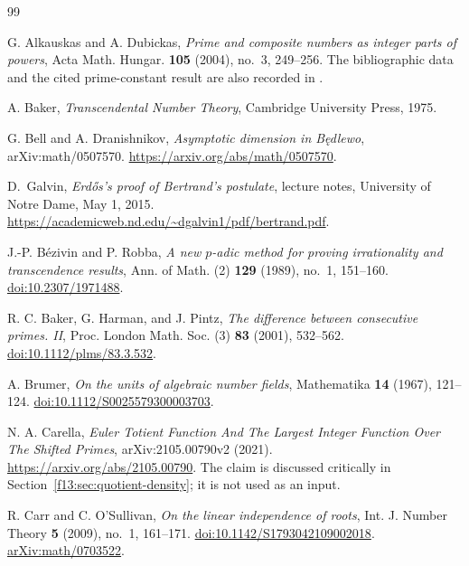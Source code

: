 \documentclass[11pt,a4paper]{article}
\theoremstyle{definition}
\theoremstyle{remark}
\numberwithin{equation}{section}
\begin{document}
\clearpage
{}
\begingroup\footnotesize
\begin{thebibliography}{99}

G. Alkauskas and A. Dubickas,
\emph{Prime and composite numbers as integer parts of powers},
Acta Math. Hungar. \textbf{105} (2004), no.~3, 249--256.
The bibliographic data and the cited prime-constant result are also
recorded in \cite{SaitoMills,SaitoTakeda2022}.

A. Baker, \emph{Transcendental Number Theory}, Cambridge University Press, 1975.

G. Bell and A. Dranishnikov, \emph{Asymptotic dimension in B\k{e}dlewo},
arXiv:math/0507570.
\url{https://arxiv.org/abs/math/0507570}.

D.~Galvin,
\emph{Erd\H{o}s's proof of Bertrand's postulate},
lecture notes, University of Notre Dame, May 1, 2015.
\url{https://academicweb.nd.edu/~dgalvin1/pdf/bertrand.pdf}.

J.-P. B\'ezivin and P. Robba,
\emph{A new $p$-adic method for proving irrationality and transcendence results},
Ann. of Math. (2) \textbf{129} (1989), no.~1, 151--160.
\href{https://doi.org/10.2307/1971488}{doi:10.2307/1971488}.

R. C. Baker, G. Harman, and J. Pintz,
\emph{The difference between consecutive primes. II},
Proc. London Math. Soc. (3) \textbf{83} (2001), 532--562.
\href{https://doi.org/10.1112/plms/83.3.532}{doi:10.1112/plms/83.3.532}.

A. Brumer, \emph{On the units of algebraic number fields},
Mathematika \textbf{14} (1967), 121--124.
\href{https://doi.org/10.1112/S0025579300003703}{doi:10.1112/S0025579300003703}.

N. A. Carella, \emph{Euler Totient Function And The Largest Integer
Function Over The Shifted Primes}, arXiv:2105.00790v2 (2021).
\url{https://arxiv.org/abs/2105.00790}.
The claim is discussed critically in Section~\ref{f13:sec:quotient-density};
it is not used as an input.

R. Carr and C. O'Sullivan,
\emph{On the linear independence of roots},
Int. J. Number Theory \textbf{5} (2009), no.~1, 161--171.
\href{https://doi.org/10.1142/S1793042109002018}{doi:10.1142/S1793042109002018}.
\href{https://arxiv.org/abs/math/0703522}{arXiv:math/0703522}.


\end{thebibliography}
\end{document}
